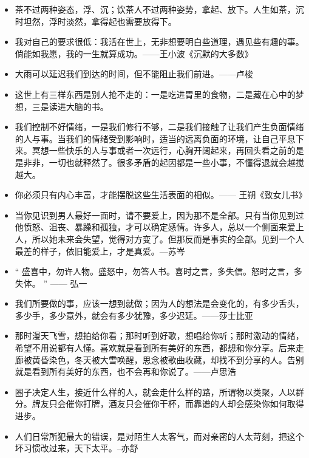 \documentclass[UTF8,a4paper,8pt]{ctexart}
\begin{document}
\begin{itemize}
 	\item 茶不过两种姿态，浮、沉；饮茶人不过两种姿势，拿起、放下。人生如茶，沉时坦然，浮时淡然，拿得起也需要放得下。
 	
 	\item 我对自己的要求很低：我活在世上，无非想要明白些道理，遇见些有趣的事。倘能如我愿，我的一生就算成功。——王小波《沉默的大多数》
 	
 	\item 大雨可以延迟我们到达的时间，但不能阻止我们前进。——卢梭
 	
 	\item 这世上有三样东西是别人抢不走的：一是吃进胃里的食物，二是藏在心中的梦想，三是读进大脑的书。
 	
 	\item 我们控制不好情绪，一是我们修行不够，二是我们接触了让我们产生负面情绪的人与事。当我们的情绪受到影响时，适当的远离负面的环境，让自己平息下来。冥想一些快乐的人与事或者一次远行，心胸开阔起来，再回头看之前的是是非非，一切也就释然了。很多矛盾的起因都是一些小事，不懂得退就会越搅越大。
 	
 	\item 你必须只有内心丰富，才能摆脱这些生活表面的相似。—— 王朔《致女儿书》
 	
 	\item 当你见识到男人最好一面时，请不要爱上，因为那不是全部。只有当你见到过他愤怒、沮丧、暴躁和孤独，才可以确定感情。许多人，总以一个侧面来爱上人，所以她未来会失望，觉得对方变了。但那反而是事实的全部。见到一个人最差的样子，依旧能爱上，才是真爱。---苏岑
 	
 	\item “ 盛喜中，勿许人物。盛怒中，勿答人书。喜时之言，多失信。怒时之言，多失体。 ” —— 弘一
 	
 	\item 我们所要做的事，应该一想到就做；因为人的想法是会变化的，有多少舌头，多少手，多少意外，就会有多少犹豫，多少迟延。——莎士比亚
 	
 	\item 那时漫天飞雪，想拍给你看；那时听到好歌，想唱给你听；那时激动的情绪，希望不用说都有人懂。喜欢就是看到所有美好的东西，都想和你分享。后来走廊被黄昏染色，冬天被大雪唤醒，思念被歌曲收藏，却找不到分享的人。告别就是看到所有美好的东西，也不会再和你说了。——卢思浩
 	
 	\item 圈子决定人生，接近什么样的人，就会走什么样的路，所谓物以类聚，人以群分。牌友只会催你打牌，酒友只会催你干杯，而靠谱的人却会感染你如何取得进步。
 	
 	\item 人们日常所犯最大的错误，是对陌生人太客气，而对亲密的人太苛刻，把这个坏习惯改过来，天下太平。--亦舒
 	

\end{itemize}
\end{document}
